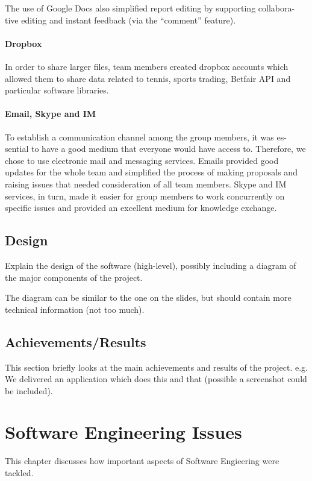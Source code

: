 \documentclass[10pt]{report}
\begin{document}
The use of Google Docs also simplified report editing by supporting collabora-
tive editing and instant feedback (via the ``comment'' feature).


\subsubsection{Dropbox}
In order to share larger files, team members created dropbox accounts which
allowed them to share data related to tennis, sports trading, Betfair API and
particular software libraries.

\subsubsection{Email, Skype and IM}

To establish a communication channel among the group members, it was es-
sential to have a good medium that everyone would have access to. Therefore,
we chose to use electronic mail and messaging services. Emails provided good
updates for the whole team and simplified the process of making proposals and
raising issues that needed consideration of all team members. Skype and IM
services, in turn, made it easier for group members to work concurrently on
specific issues and provided an excellent medium for knowledge exchange.

\section{Design}
Explain the design of the software (high-level), possibly including a diagram of the major components of the project.

The diagram can be similar to the one on the slides, but should contain more technical information (not too much).

\section{Achievements/Results}
This section briefly looks at the main achievements and results of the project.
e.g. We delivered an application which does this and that (possible a screenshot could be included).

\chapter{Software Engineering Issues}

This chapter discusses how important aspects of Software Engieering were tackled.
\end{document}

